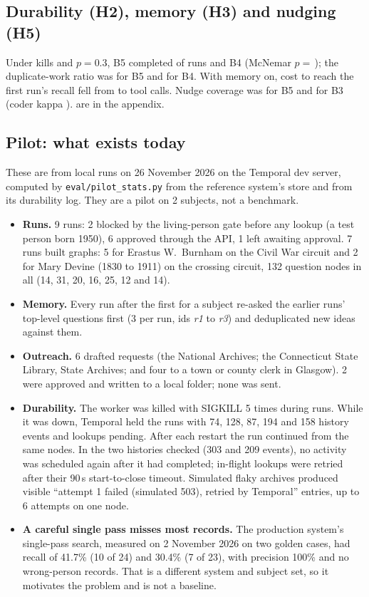 \subsection{Durability (H2), memory (H3) and nudging (H5)}

Under kills and $p=0.3$, B5 completed  of runs and B4  (McNemar $p=$\,); the duplicate-work ratio was  for B5 and  for B4. With memory on, cost to reach the first run's recall fell from  to  tool calls. Nudge coverage was  for B5 and  for B3 (coder kappa ).  are in the appendix.

\subsection{Pilot: what exists today}
\label{sec:pilot}
These are from local runs on 26 November 2026 on the Temporal dev server, computed by \texttt{eval/pilot\_stats.py} from the reference system's store and from its durability log. They are a pilot on 2 subjects, not a benchmark.
\begin{itemize}
\item \textbf{Runs.} 9 runs: 2 blocked by the living-person gate before any lookup (a test person born 1950), 6 approved through the API, 1 left awaiting approval. 7 runs built graphs: 5 for Erastus W.\ Burnham on the Civil War circuit and 2 for Mary Devine (1830 to 1911) on the crossing circuit, 132 question nodes in all (14, 31, 20, 16, 25, 12 and 14).
\item \textbf{Memory.} Every run after the first for a subject re-asked the earlier runs' top-level questions first (3 per run, ids \textit{r1} to \textit{r3}) and deduplicated new ideas against them.
\item \textbf{Outreach.} 6 drafted requests (the National Archives; the Connecticut State Library, State Archives; and four to a town or county clerk in Glasgow). 2 were approved and written to a local folder; none was sent.
\item \textbf{Durability.} The worker was killed with SIGKILL 5 times during runs. While it was down, Temporal held the runs with 74, 128, 87, 194 and 158 history events and lookups pending. After each restart the run continued from the same nodes. In the two histories checked (303 and 209 events), no activity was scheduled again after it had completed; in-flight lookups were retried after their 90\,s start-to-close timeout. Simulated flaky archives produced visible ``attempt 1 failed (simulated 503), retried by Temporal'' entries, up to 6 attempts on one node.
\item \textbf{A careful single pass misses most records.} The production system's single-pass search, measured on 2 November 2026 on two golden cases, had recall of 41.7\% (10 of 24) and 30.4\% (7 of 23), with precision 100\% and no wrong-person records. That is a different system and subject set, so it motivates the problem and is not a \bench baseline.
\end{itemize}

